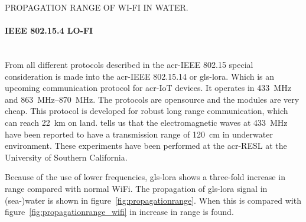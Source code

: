 \begin{RoyalFigure}[!htb, label=fig:propagationrange_wifi]{PROPAGATION RANGE OF WI-FI IN WATER.}
\end{RoyalFigure}

\paragraph{IEEE 802.15.4 LO-FI} \hfill \\
From all different protocols described in the \gls{acr-IEEE} 802.15 special consideration is made into the \gls{acr-IEEE} 802.15.14 or \gls{gls-lora}.
Which is an upcoming communication protocol for \gls{acr-IoT} devices. It operates in \SI{433}{\mega\hertz} and \SIrange{863}{870}{\mega\hertz}. The protocols are opensource and the modules are very cheap. This protocol is developed for robust long range communication, which can reach \SI{22}{\kilo\meter} on land.
\citet{akyildiz_underwater_2005} tells us that the electromagnetic waves at \SI{433}{\mega\hertz} have been reported to have a transmission range of \SI{120}{\cm} in underwater environment. These experiments have been performed at the \gls{acr-RESL} at the University of Southern California.

Because of the use of lower frequencies, \gls{gls-lora} shows a three-fold increase in range compared with normal WiFi. The propagation of \gls{gls-lora} signal in (sea-)water is shown in figure~\ref{fig:propagationrange}.
When this is compared with figure~\ref{fig:propagationrange_wifi} in increase in range is found.

